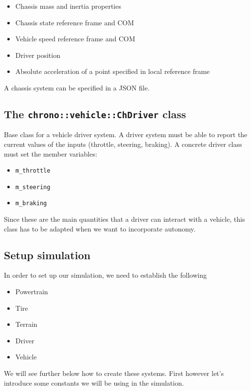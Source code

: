 \begin{itemize}
\item Chassis mass and inertia properties
\item Chassis state reference frame and COM
\item Vehicle speed reference frame and COM
\item Driver position
\item Absolute acceleration of a point specified in local reference frame
\end{itemize}

A chassis system can be specified in a JSON file.

\subsection{ The \lstinline{chrono::vehicle::ChDriver} class}

Base class for a vehicle driver system.
A driver system must be able to report the current values of the inputs (throttle, steering, braking). 
A concrete driver class must set the member variables:

\begin{itemize}
\item \lstinline{m_throttle}
\item \lstinline{m_steering} 
\item \lstinline{m_braking}
\end{itemize}
Since these are the main quantities that a driver can interact with a vehicle, this class has to be adapted
when we want to incorporate autonomy. 


\subsection{Setup simulation}

In order to set up our simulation, we need to establish the following

\begin{itemize}
\item Powertrain
\item Tire
\item Terrain
\item Driver
\item Vehicle
\end{itemize}

We will see further below how to create these systems. First however let's introduce some constants we will be using in the simulation.


